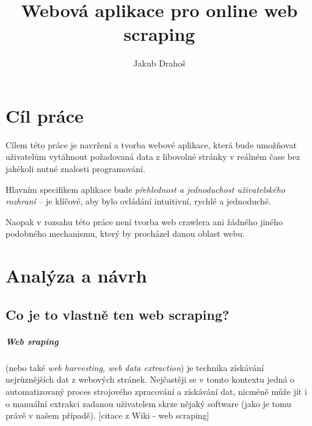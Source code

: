 \documentclass[thesis=B,czech]{FITthesis}[2012/06/26]
\title{Webová aplikace pro online web scraping}
\author{Jakub Drahoš} %
\begin{document}

\begin{introduction}
\end{introduction}





\chapter{Cíl práce}

Cílem této práce je navržení a tvorba webové aplikace, která bude umož\v{n}ovat uživatelům vytáhnout požadovaná data z libovolné stránky v reálném čase bez jakékoli nutné znalosti programování.

Hlavním specifikem aplikace bude \emph{přehlednost a jednoduchost uživatelského rozhraní} -- je klíčové, aby bylo ovládání intuitivní, rychlé a jednoduché.

Naopak v rozsahu této práce není tvorba web crawlera ani žádného jiného podobného mechanismu, který by procházel danou oblast webu.




\chapter{Analýza a návrh}


\section{Co je to vlastně ten web scraping?}
\paragraph{Web sraping}
(nebo také \emph{web harvesting, web data extraction}) je technika získávání nejrůznějších dat z webových stránek. Nejčastěji se v tomto kontextu jedná o automatizovaný proces strojového zpracování a získávání dat, nicméně může jít i o manuální extrakci zadanou uživatelem skrze nějaký software (jako je tomu právě v našem případě). [citace z Wiki - web scraping]
\end{document}
